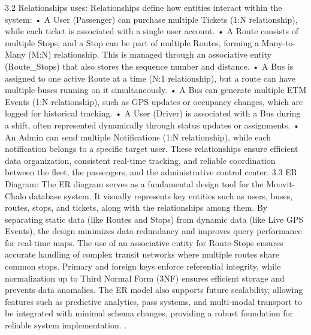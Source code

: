 3.2	 Relationships uses:
Relationships define how entities interact within the system:
•	A User (Passenger) can purchase multiple Tickets (1:N relationship), while each ticket is associated with a single user account.
•	A Route consists of multiple Stops, and a Stop can be part of multiple Routes, forming a Many-to-Many (M:N) relationship. This is managed through an associative entity (Route_Stops) that also stores the sequence number and distance.
•	A Bus is assigned to one active Route at a time (N:1 relationship), but a route can have multiple buses running on it simultaneously.
•	A Bus can generate multiple ETM Events (1:N relationship), such as GPS updates or occupancy changes, which are logged for historical tracking.
•	A User (Driver) is associated with a Bus during a shift, often represented dynamically through status updates or assignments.
•	An Admin can send multiple Notifications (1:N relationship), while each notification belongs to a specific target user.
These relationships ensure efficient data organization, consistent real-time tracking, and reliable coordination between the fleet, the passengers, and the administrative control center.
3.3	 ER Diagram: 
The ER diagram serves as a fundamental design tool for the Moovit-Chalo database system. It visually represents key entities such as users, buses, routes, stops, and tickets, along with the relationships among them. By separating static data (like Routes and Stops) from dynamic data (like Live GPS Events), the design minimizes data redundancy and improves query performance for real-time maps.
The use of an associative entity for Route-Stops ensures accurate handling of complex transit networks where multiple routes share common stops. Primary and foreign keys enforce referential integrity, while normalization up to Third Normal Form (3NF) ensures efficient storage and prevents data anomalies. The ER model also supports future scalability, allowing features such as predictive analytics, pass systems, and multi-modal transport to be integrated with minimal schema changes, providing a robust foundation for reliable system implementation.
.
 


